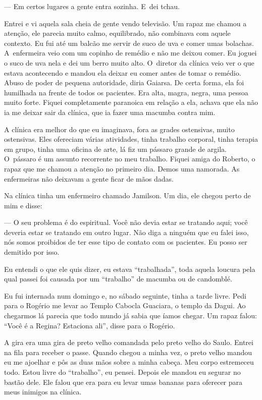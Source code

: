 --- Em certos lugares a gente entra sozinha. E~dei tchau.

Entrei e vi aquela sala cheia de gente vendo televisão. Um rapaz me
chamou a atenção, ele parecia muito calmo, equilibrado, não combinava
com aquele contexto. Eu fui até um balcão me servir de suco de uva e
comer umas bolachas. A~enfermeira veio com um copinho de remédio e não
me deixou comer. Eu joguei o suco de uva nela e dei um berro muito alto.
O~diretor da clínica veio ver o que estava acontecendo e mandou ela
deixar eu comer antes de tomar o remédio. Abuso de poder de pequena
autoridade, diria Gaiarsa. De certa forma, ela foi humilhada na frente
de todos os pacientes. Era alta, magra, negra, uma pessoa muito forte.
Fiquei completamente paranoica em relação a ela, achava que ela não ia
me deixar sair da clínica, que ia fazer uma macumba contra mim.

A clínica era melhor do que eu imaginava, fora as grades ostensivas,
muito ostensivas. Eles ofereciam várias atividades, tinha trabalho
corporal, tinha terapia em grupo, tinha uma oficina de arte, lá fiz um
pássaro grande de argila. O~pássaro é um assunto recorrente no meu
trabalho. Fiquei amiga do Roberto, o rapaz que me chamou a atenção no
primeiro dia. Demos uma namorada. As enfermeiras não deixavam a gente
ficar de mãos dadas.

Na clínica tinha um enfermeiro chamado Jamilson. Um dia, ele chegou
perto de mim e disse:

--- O seu problema é do espiritual. Você não devia estar se tratando
aqui; você deveria estar se tratando em outro lugar. Não diga a ninguém
que eu falei isso, nós somos proibidos de ter esse tipo de contato com
os pacientes. Eu posso ser demitido por isso.

Eu entendi o que ele quis dizer, eu estava ``trabalhada'', toda aquela
loucura pela qual passei foi causada por um ``trabalho'' de macumba ou
de candomblé.

Eu fui internada num domingo e, no sábado seguinte, tinha a tarde livre.
Pedi para o Rogério me levar ao Templo Cabocla Guaciara, o templo da
Dagui. Ao chegarmos lá parecia que todo mundo já sabia que íamos chegar.
Um rapaz falou: ``Você é a Regina? Estaciona ali'', disse para o
Rogério.

A gira era uma gira de preto velho comandada pelo preto velho do Saulo.
Entrei na fila para receber o passe. Quando chegou a minha vez, o preto
velho mandou eu me ajoelhar e pôs as duas mãos sobre a minha cabeça. Meu
corpo estremeceu todo. Estou livre do ``trabalho'', eu pensei. Depois
ele mandou eu segurar no bastão dele. Ele falou que era para eu levar
umas bananas para oferecer para meus inimigos na clínica.

